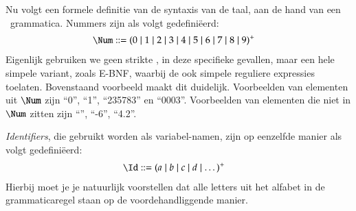 Nu volgt een formele definitie van de syntaxis van de taal, aan de hand van een \BNF\ grammatica. Nummers zijn als volgt gedefiniëerd:
\begin{align*}
  \Num \GrammarDef (0 \mid 1 \mid 2 \mid 3 \mid 4 \mid 5 \mid 6 \mid 7 \mid 8 \mid 9)^+
\end{align*}
Eigenlijk gebruiken we geen strikte \BNF, in deze specifieke gevallen, maar een hele simpele variant, zoals \textsc{E-BNF}, waarbij de ook simpele reguliere expressies toelaten.%
Bovenstaand voorbeeld maakt dit duidelijk. Voorbeelden van elementen uit $\Num$ zijn ``0'', ``1'', ``235783'' en ``0003''. Voorbeelden van elementen die niet in $\Num$ zitten zijn ``'', ``-6'', ``4.2''.

\emph{Identifiers}, die gebruikt worden als variabel-namen,%
zijn op eenzelfde manier als volgt gedefiniëerd:
\begin{align*}
  \Id \GrammarDef (a \mid b \mid c \mid d \mid \dots)^+
\end{align*}
Hierbij moet je je natuurlijk%
voorstellen dat alle letters uit het alfabet in de grammaticaregel staan op de voordehandliggende%
manier.

